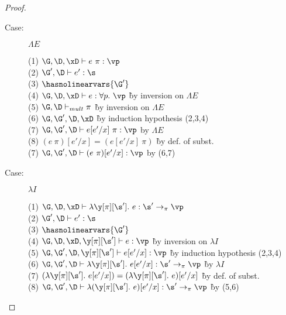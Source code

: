 \begin{proof}
\begin{description}
\item[Case:] $\Lambda E$
\begin{tabbing}
    (1) $\G, \D, \xD \vdash e~\pi : \vp$\\
    (2) $\G', \D \vdash e' : \s$\\
    (3) $\hasnolinearvars{\G'}$\\
    (4) $\G, \D, \xD \vdash e : \forall p.~\vp$ \` by inversion on $\Lambda E$\\
    (5) $\G, \D \vdash_{mult} \pi$ \` by inversion on $\Lambda E$\\
    (6) $\G, \G', \D, \xD$ \` by induction hypothesis (2,3,4)\\
    (7) $\G, \G', \D \vdash e[e'/x]~\pi : \vp$ by $\Lambda E$\\
    (8) $(e~\pi)[e'/x] = (e[e'/x]~\pi)$ \` by def. of subst.\\
    (7) $\G, \G', \D \vdash (e~\pi)[e'/x] : \vp$ by (6,7)\\
\end{tabbing}

\item[Case:] $\lambda I$
\begin{tabbing}
    (1) $\G, \D, \xD \vdash \lambda \y[\pi][\s'].~e : \s' \to_\pi \vp$\\
    (2) $\G', \D \vdash e' : \s$\\
    (3) $\hasnolinearvars{\G'}$\\
    (4) $\G, \D, \xD, \y[\pi][\s'] \vdash e : \vp$ \` by inversion on $\lambda I$\\
    (5) $\G, \G', \D, \y[\pi][\s'] \vdash e[e'/x] : \vp$ \` by induction hypothesis (2,3,4)\\
    (6) $\G, \G', \D \vdash \lambda \y[\pi][\s'].~e[e'/x] : \s' \to_\pi \vp$ \` by $\lambda I$\\
    (7) $(\lambda \y[\pi][\s'].~e[e'/x]) = (\lambda \y[\pi][\s'].~e)[e'/x]$ \` by def. of subst.\\
    (8) $\G, \G', \D \vdash \lambda (\y[\pi][\s'].~e)[e'/x] : \s' \to_\pi \vp$ \` by (5,6)\\
\end{tabbing}


\end{description}
\end{proof}
